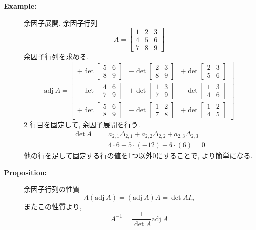 \documentclass[dvipdfmx]{jsarticle}
\begin{document}
\begin{description}
        \item[\bf{Example:}] 余因子展開, 余因子行列 \\
            $$ A = \begin{bmatrix}
                1 & 2 & 3 \\
                4 & 5 & 6 \\
                7 & 8 & 9
            \end{bmatrix}
            $$
            余因子行列を求める.
            $$ 
                \mathrm{adj} \ A = \begin{bmatrix} 
                +\det \begin{bmatrix} 5 & 6 \\ 8 & 9 \end{bmatrix} & -\det \begin{bmatrix} 2 & 3 \\ 8 & 9 \end{bmatrix} & +\det \begin{bmatrix} 2 & 3 \\ 5 & 6 \end{bmatrix} \\
                -\det \begin{bmatrix} 4 & 6 \\ 7 & 9 \end{bmatrix} & +\det \begin{bmatrix} 1 & 3 \\ 7 & 9 \end{bmatrix} & -\det \begin{bmatrix} 1 & 3 \\ 4 & 6 \end{bmatrix} \\
                +\det \begin{bmatrix} 5 & 6 \\ 8 & 9 \end{bmatrix} & -\det \begin{bmatrix} 1 & 2 \\ 7 & 8 \end{bmatrix} & +\det \begin{bmatrix} 1 & 2 \\ 4 & 5 \end{bmatrix} 
                \end{bmatrix}
            $$
            $2$ 行目を固定して, 余因子展開を行う.
            \begin{eqnarray*}
                \det A &=& a_{2,1} \Delta_{2,1} + a_{2,2} \Delta_{2,2} + a_{2,3} \Delta_{2,3} \\
                &=& 4 \cdot 6 + 5 \cdot (-12) + 6 \cdot (6) = 0
            \end{eqnarray*}
            他の行を足して固定する行の値を1つ以外0にすることで, より簡単になる.
        \item[\bf{Proposition:}] 余因子行列の性質
            $$ A (\mathrm{adj} \ A) = (\mathrm{adj} \ A) A = \det A I_n $$
            またこの性質より, 
            $$ A^{-1} = \dfrac{1}{\det A} \mathrm{adj} \ A $$

    \end{description}
\end{document}
